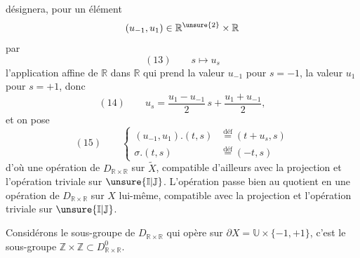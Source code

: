 désignera, pour un élément
\[
(u_{-1},u_1)\in\mathbb R^{\unsure{2}}\times\mathbb R
\]
par
\[
(13)\qquad s\longmapsto u_s
\]
l'application affine de $\mathbb R$ dans $\mathbb R$  qui prend la valeur $u_{-1}$ pour $s=-1$, la valeur $u_1$ pour $s=+1$,  donc
\[
(14)\qquad u_s=\frac{u_1-u_{-1}}2\,s+\frac{u_1+u_{-1}}2,
\]
et on pose
\[
(15)\qquad\left\{\begin{aligned}
(u_{-1},u_1).(t,s)&\overset{\mathrm{déf}}{=}(t+u_s,s)\\
\sigma.(t,s)&\overset{\mathrm{déf}}{=}(-t,s)
\end{aligned}\right.
\]
d'où une opération de $D_{\mathbb R\times\mathbb R}$ sur $\widetilde X$, compatible d'ailleurs avec la  projection
et l'opération triviale sur $\unsure{\mathbb I|\mathbb J}$. L'opération passe bien au quotient en une opération de $D_{\mathbb R\times\mathbb R}$ sur $X$ lui-même, compatible avec la projection
et l'opération triviale sur $\unsure{\mathbb I|\mathbb J}$.

Considérons le sous-groupe de $D_{\mathbb R\times\mathbb R}$ qui opère  sur $\partial X=\mathbb U\times\{-1,+1\}$, c'est le sous-groupe $\mathbb Z\times\mathbb Z\subset D_{\mathbb R\times\mathbb R}^{0}$.
